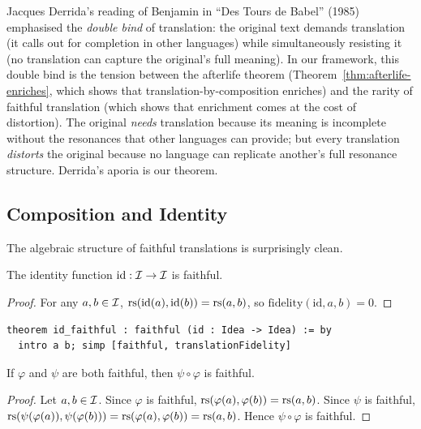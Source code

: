 \begin{remark}
Jacques Derrida's reading of Benjamin in ``Des Tours de Babel'' (1985) emphasised the \emph{double bind} of translation: the original text demands translation (it calls out for completion in other languages) while simultaneously resisting it (no translation can capture the original's full meaning).  In our framework, this double bind is the tension between the afterlife theorem (Theorem~\ref{thm:afterlife-enriches}, which shows that translation-by-composition enriches) and the rarity of faithful translation (which shows that enrichment comes at the cost of distortion).  The original \emph{needs} translation because its meaning is incomplete without the resonances that other languages can provide; but every translation \emph{distorts} the original because no language can replicate another's full resonance structure.  Derrida's aporia is our theorem.
\end{remark}

\subsection{Composition and Identity}

The algebraic structure of faithful translations is surprisingly clean.

\begin{theorem}
\label{thm:id-faithful}
The identity function $\mathrm{id} : \mathcal{I} \to \mathcal{I}$ is faithful.
\end{theorem}

\begin{proof}
For any $a, b \in \mathcal{I}$, $\mathrm{rs}(\mathrm{id}(a), \mathrm{id}(b)) = \mathrm{rs}(a, b)$,
so $\mathrm{fidelity}(\mathrm{id}, a, b) = 0$.
\end{proof}

\begin{lstlisting}
theorem id_faithful : faithful (id : Idea -> Idea) := by
  intro a b; simp [faithful, translationFidelity]
\end{lstlisting}

\begin{theorem}
\label{thm:faithful-comp}
If $\varphi$ and $\psi$ are both faithful, then $\psi \circ \varphi$ is
faithful.
\end{theorem}

\begin{proof}
Let $a, b \in \mathcal{I}$.  Since $\varphi$ is faithful,
$\mathrm{rs}(\varphi(a), \varphi(b)) = \mathrm{rs}(a, b)$.  Since $\psi$ is faithful,
$\mathrm{rs}(\psi(\varphi(a)), \psi(\varphi(b))) = \mathrm{rs}(\varphi(a), \varphi(b))
= \mathrm{rs}(a, b)$.  Hence $\psi \circ \varphi$ is faithful.
\end{proof}

